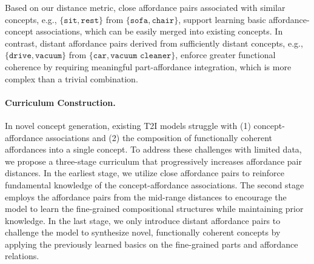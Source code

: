 Based on our distance metric, close affordance pairs associated with similar concepts, e.g., $\{\texttt{sit}, \texttt{rest}\}$ from $\{\texttt{sofa}, \texttt{chair}\}$, support learning basic affordance-concept associations, which can be easily merged into existing concepts. In contrast, distant affordance pairs derived from sufficiently distant concepts, e.g., $\{\texttt{drive}, \texttt{vacuum}\}$ from $\{\texttt{car}, \texttt{vacuum cleaner}\}$, enforce greater functional coherence by requiring meaningful part-affordance integration, which is more complex than a trivial combination. 
\paragraph{Curriculum Construction.}
In novel concept generation, existing T2I models struggle with (1) concept-affordance associations and (2) the composition of functionally coherent affordances into a single concept. To address these challenges with limited data, we propose a three-stage curriculum that progressively increases affordance pair distances. In the earliest stage, we utilize close affordance pairs to reinforce fundamental knowledge of the concept-affordance associations. The second stage employs the affordance pairs from the mid-range distances to encourage the model to learn the fine-grained compositional structures while maintaining prior knowledge. In the last stage, we only introduce distant affordance pairs to challenge the model to synthesize novel, functionally coherent concepts by applying the previously learned basics on the fine-grained parts and affordance relations.

